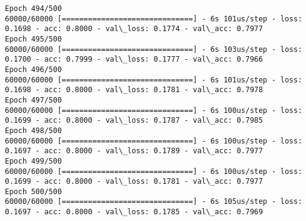 \documentclass[11pt]{article}
\begin{document}
\begin{Verbatim}[commandchars=\\\{\}]
Epoch 494/500
60000/60000 [==============================] - 6s 101us/step - loss: 0.1698 - acc: 0.8000 - val\_loss: 0.1774 - val\_acc: 0.7977
Epoch 495/500
60000/60000 [==============================] - 6s 103us/step - loss: 0.1700 - acc: 0.7999 - val\_loss: 0.1777 - val\_acc: 0.7966
Epoch 496/500
60000/60000 [==============================] - 6s 101us/step - loss: 0.1698 - acc: 0.8000 - val\_loss: 0.1781 - val\_acc: 0.7978
Epoch 497/500
60000/60000 [==============================] - 6s 100us/step - loss: 0.1699 - acc: 0.8000 - val\_loss: 0.1787 - val\_acc: 0.7985
Epoch 498/500
60000/60000 [==============================] - 6s 100us/step - loss: 0.1697 - acc: 0.8000 - val\_loss: 0.1789 - val\_acc: 0.7977
Epoch 499/500
60000/60000 [==============================] - 6s 100us/step - loss: 0.1699 - acc: 0.8000 - val\_loss: 0.1781 - val\_acc: 0.7977
Epoch 500/500
60000/60000 [==============================] - 6s 105us/step - loss: 0.1697 - acc: 0.8000 - val\_loss: 0.1785 - val\_acc: 0.7969

    \end{Verbatim}
\end{document}
